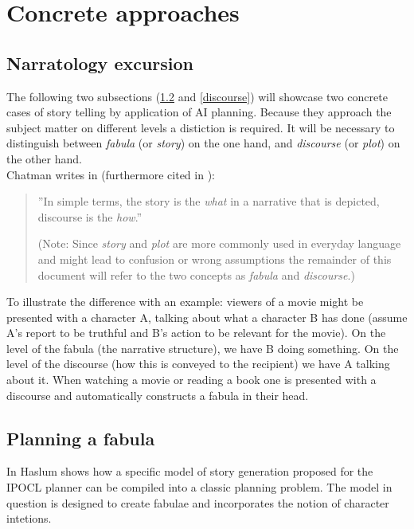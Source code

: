 \section{Concrete approaches}\label{approaches}
\subsection{Narratology excursion}
The following two subsections (\ref{fabula} and \ref{discourse}) will showcase two concrete cases of story telling by application of AI planning. Because they approach the subject matter on different levels a distiction is required. It will be necessary to distinguish between \emph{fabula} (or \emph{story}) on the one hand, and \emph{discourse} (or \emph{plot}) on the other hand.\\
Chatman writes in \cite{Chatman1980} (furthermore cited in \cite{Herman10}):
\begin{quote}
''In simple terms, the story is the \emph{what} in a narrative that is depicted, discourse is the \emph{how}.''

(Note: Since \emph{story} and \emph{plot} are more commonly used in everyday language and might lead to confusion or wrong assumptions the remainder of this document will refer to the two concepts as \emph{fabula} and \emph{discourse}.)
\end{quote}
To illustrate the difference with an example: viewers of a movie might be presented with a character A, talking about what a character B has done (assume A's report to be truthful and B's action to be relevant for the movie). On the level of the fabula (the narrative structure), we have B doing something. On the level of the discourse (how this is conveyed to the recipient) we have A talking about it. When watching a movie or reading a book one is presented with a discourse and automatically constructs a fabula in their head.
\subsection{Planning a fabula}\label{fabula}
In \cite{Haslum14} Haslum shows how a specific model of story generation proposed for the IPOCL planner\cite{Riedl10} can be compiled into a classic planning problem. The model in question is designed to create fabulae and incorporates the notion of character intetions.
